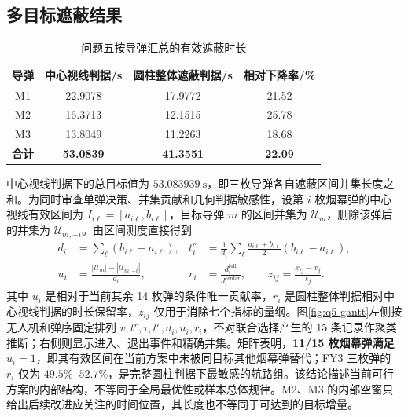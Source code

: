 \documentclass[UTF8,a4paper,12pt,fontset=windows]{ctexart}
\newcommand{\thead}[1]{{\bfseries\boldmath #1}}
\begin{document}
\subsection{多目标遮蔽结果}

\begin{table}[!htbp]
\centering
\caption{问题五按导弹汇总的有效遮蔽时长}
\label{tab:q5-duration}
\begin{tabular}{cccc}
\toprule
\thead{导弹} & \thead{中心视线判据/s} & \thead{圆柱整体遮蔽判据/s} & \thead{相对下降率/\%}\\
\midrule
M1 & 22.9078 & 17.9772 & 21.52\\
M2 & 16.3713 & 12.1515 & 25.78\\
M3 & 13.8049 & 11.2263 & 18.68\\
\midrule
\textbf{合计} & \textbf{53.0839} & \textbf{41.3551} & \textbf{22.09}\\
\bottomrule
\end{tabular}
\end{table}

中心视线判据下的总目标值为 $\bm{53.083939\ \mathrm{s}}$，即三枚导弹各自遮蔽区间并集长度之和。为同时审查单弹决策、并集贡献和几何判据敏感性，设第 $i$ 枚烟幕弹的中心视线有效区间为 $I_{i\ell}=[a_{i\ell},b_{i\ell}]$，目标导弹 $m$ 的区间并集为 $\mathcal U_m$，删除该弹后的并集为 $\mathcal U_{m,-i}$。由区间测度直接得到
\begin{equation}
\begin{aligned}
d_i&=\sum_{\ell}(b_{i\ell}-a_{i\ell}),
&t_i^c&=\frac{1}{d_i}\sum_{\ell}\frac{a_{i\ell}+b_{i\ell}}{2}(b_{i\ell}-a_{i\ell}),\\
u_i&=\frac{|\mathcal U_m|-|\mathcal U_{m,-i}|}{d_i},
&r_i&=\frac{d_i^{\mathrm{full}}}{d_i^{\mathrm{center}}},
\qquad z_{ij}=\frac{x_{ij}-\bar x_j}{s_j}.
\end{aligned}
\label{eq:q5-role-metrics}
\end{equation}
其中 $u_i$ 是相对于当前其余 14 枚弹的条件唯一贡献率，$r_i$ 是圆柱整体判据相对中心视线判据的时长保留率，$z_{ij}$ 仅用于消除七个指标的量纲。图\ref{fig:q5-gantt}左侧按无人机和弹序固定排列 $v,t^r,\tau,t^c,d_i,u_i,r_i$，不对联合选择产生的 15 条记录作聚类推断；右侧则显示进入、退出事件和精确并集。矩阵表明，\textbf{11/15 枚烟幕弹满足 $u_i=1$}，即其有效区间在当前方案中未被同目标其他烟幕弹替代；FY3 三枚弹的 $r_i$ 仅为 \textbf{$49.5\%$--$52.7\%$}，是完整圆柱判据下最敏感的航路组。该结论描述当前可行方案的内部结构，不等同于全局最优性或样本总体规律。M2、M3 的内部空窗只给出后续改进应关注的时间位置，其长度也不等同于可达到的目标增量。
\end{document}

